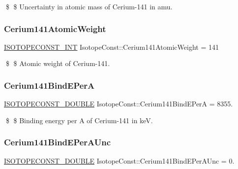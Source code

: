 \$ \$ Uncertainty in atomic mass of Cerium-\/141 in amu. \mbox{\label{group___isotope_const-_cerium-_ce141_gad1c16c442fb2a6b2fefd0281a7d4e9cf}} 
\subsubsection{\texorpdfstring{Cerium141\+Atomic\+Weight}{Cerium141AtomicWeight}}
{\footnotesize\ttfamily \mbox{\hyperlink{group___isotope_const-_macros_ga5f18360b3e99483a35c32d789e62621c}{I\+S\+O\+T\+O\+P\+E\+C\+O\+N\+S\+T\+\_\+\+I\+NT}} Isotope\+Const\+::\+Cerium141\+Atomic\+Weight = 141}

\$ \$ Atomic weight of Cerium-\/141. \mbox{\label{group___isotope_const-_cerium-_ce141_ga849b10db58c9c66620d75c09770ba995}} 
\subsubsection{\texorpdfstring{Cerium141\+Bind\+E\+PerA}{Cerium141BindEPerA}}
{\footnotesize\ttfamily \mbox{\hyperlink{group___isotope_const-_macros_ga8f45a7272ce02c0b4c65c44636ed719a}{I\+S\+O\+T\+O\+P\+E\+C\+O\+N\+S\+T\+\_\+\+D\+O\+U\+B\+LE}} Isotope\+Const\+::\+Cerium141\+Bind\+E\+PerA = 8355.}

\$ \$ Binding energy per A of Cerium-\/141 in keV. \mbox{\label{group___isotope_const-_cerium-_ce141_gadf61496a596247f86eadf505070939f2}} 
\subsubsection{\texorpdfstring{Cerium141\+Bind\+E\+Per\+A\+Unc}{Cerium141BindEPerAUnc}}
{\footnotesize\ttfamily \mbox{\hyperlink{group___isotope_const-_macros_ga8f45a7272ce02c0b4c65c44636ed719a}{I\+S\+O\+T\+O\+P\+E\+C\+O\+N\+S\+T\+\_\+\+D\+O\+U\+B\+LE}} Isotope\+Const\+::\+Cerium141\+Bind\+E\+Per\+A\+Unc = 0.}

